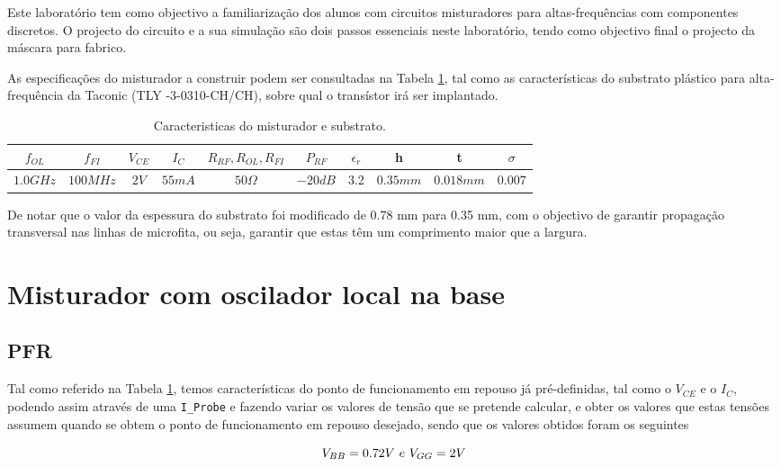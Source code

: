 \documentclass[11pt]{article}
\numberwithin{equation}{section}
\begin{document}
Este laboratório tem como objectivo a familiarização dos alunos com circuitos misturadores  para altas-frequências com componentes discretos. O projecto do circuito e a sua simulação são dois passos essenciais neste laboratório, tendo como objectivo final o projecto da máscara para fabrico.

As especificações do misturador a construir podem ser consultadas na Tabela \ref{tab:car}, tal como as características do substrato plástico para alta-frequência da Taconic (TLY -3-0310-CH/CH), sobre qual o transístor irá ser implantado. 

\begin{table}[H]
	\centering
	\begin{tabular}{|c|c|c|c|c|c|c|c|c|c|}
		\hline $ f_{OL} $ & $ f_{FI} $ & $ V_{CE} $ & $ I_{C} $ & $ R_{RF}, R_{OL}, R_{FI} $ & $ P_{RF} $ & $ \epsilon_{r} $ & h & t & $ \sigma $\\ 
		\hline $ 1.0GHz $ & $ 100MHz $ & $ 2V $ & $ 55mA $ & $ 50\Omega $ & $ -20dB $ & 3.2 & $ 0.35mm $ & $ 0.018mm $ & $ 0.007 $ \\ 
		\hline 
	\end{tabular} 
	\caption{Caracteristicas do misturador e substrato.}
	\label{tab:car}
\end{table}

De notar que o valor da espessura do substrato foi modificado de 0.78 mm para 0.35 mm, com o objectivo de garantir propagação transversal nas linhas de microfita, ou seja, garantir que estas têm um comprimento maior que a largura. 

\section{Misturador com oscilador local na base}

\subsection{PFR}

Tal como referido na Tabela \ref{tab:car}, temos características do ponto de funcionamento em repouso já pré-definidas, tal como o $ V_{CE} $ e o $ I_{C} $, podendo assim através de uma \texttt{I\_Probe} e fazendo variar os valores de tensão que se pretende calcular, e obter os valores que estas tensões assumem quando se obtem o ponto de funcionamento em repouso desejado, sendo que os valores obtidos foram os seguintes

\begin{equation}
\centering
V_{BB}=0.72V ~ e ~ V_{GG}=2V
\end{equation}
\end{document}
